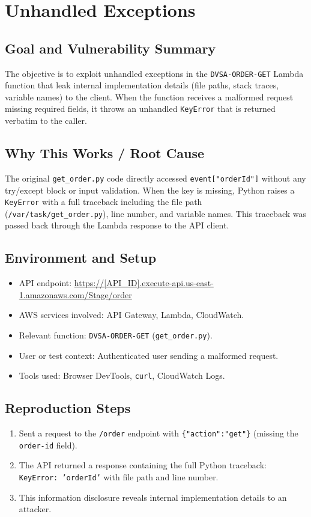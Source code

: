 \documentclass[12pt]{report}
\begin{document}
\chapter{Unhandled Exceptions}

\section{Goal and Vulnerability Summary}
The objective is to exploit unhandled exceptions in the \texttt{DVSA-ORDER-GET} Lambda function that leak internal implementation details (file paths, stack traces, variable names) to the client. When the function receives a malformed request missing required fields, it throws an unhandled \texttt{KeyError} that is returned verbatim to the caller.

\section{Why This Works / Root Cause}
The original \texttt{get\_order.py} code directly accessed \texttt{event["orderId"]} without any try/except block or input validation. When the key is missing, Python raises a \texttt{KeyError} with a full traceback including the file path (\texttt{/var/task/get\_order.py}), line number, and variable names. This traceback was passed back through the Lambda response to the API client.

\section{Environment and Setup}
\begin{itemize}
  \item API endpoint: \url{https://[API_ID].execute-api.us-east-1.amazonaws.com/Stage/order}
  \item AWS services involved: API Gateway, Lambda, CloudWatch.
  \item Relevant function: \texttt{DVSA-ORDER-GET} (\texttt{get\_order.py}).
  \item User or test context: Authenticated user sending a malformed request.
  \item Tools used: Browser DevTools, \texttt{curl}, CloudWatch Logs.
\end{itemize}

\section{Reproduction Steps}
\begin{enumerate}
  \item Sent a request to the \texttt{/order} endpoint with \texttt{\{"action":"get"\}} (missing the \texttt{order-id} field).
  \item The API returned a response containing the full Python traceback: \texttt{KeyError: 'orderId'} with file path and line number.
  \item This information disclosure reveals internal implementation details to an attacker.
\end{enumerate}
\end{document}
